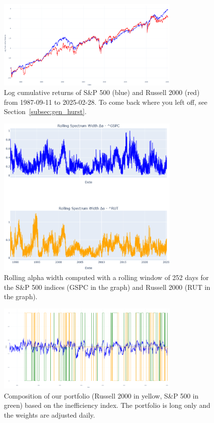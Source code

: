 \documentclass[11pt]{extarticle}
\begin{document}
\begin{figure}[ht]
    \centering
    \includegraphics[width=0.8\textwidth]{img/log_cumulative_returns.png}
    \caption{Log cumulative returns of S\&P 500 (blue) and Russell 2000 (red) from 1987-09-11 to 2025-02-28.
    To come back where you left off, see Section~\ref{subsec:gen_hurst}.}
    \label{fig:cumulative_returns}
\end{figure}


\FloatBarrier


\begin{figure}[ht]
    \centering
    \includegraphics[width=0.8\textwidth]{img/rolling_alpha_width.png}
    \caption{Rolling alpha width computed with a rolling window of 252 days
        for the S\&P 500 indices (GSPC in the graph) and Russell 2000 (RUT in the graph).}
    \label{fig:rolling_alpha_width}
\end{figure}
\FloatBarrier


\begin{figure}[ht]
    \centering
    \includegraphics[width=0.8\textwidth]{img/position_switching.png}
    \caption{Composition of our portfolio
        (Russell 2000 in yellow, S\&P 500 in green) based on the inefficiency index.
        The portfolio is long only and the weights are adjusted daily.}
    \label{fig:position_switching}
\end{figure}
\FloatBarrier
\end{document}
